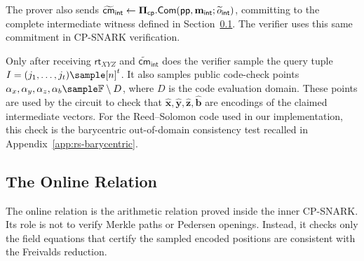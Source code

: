 \documentclass[conference,compsoc]{IEEEtran}
\newcommand{\para}{\textsf{pp}}
\newcommand{\cm}{\textsf{cm}}
\newcommand{\rt}{\textsf{rt}}
\newcommand{\vect}{\mathbf}         %
\newcommand{\bPi}{{\bf \Pi}}
\newcommand{\com}{{\sf Com}}
\newcommand{\cp}{{\mathsf{cp}}}
\theoremstyle{plain}
\theoremstyle{definition}
\theoremstyle{remark}
\begin{document}
The prover also sends
\ensuremath{\widetilde{\cm}_{\mathsf{int}}\gets
\bPi_{\cp}.\com(\para,\vect m_{\mathsf{int}};\widetilde o_{\mathsf{int}})},
committing to the complete intermediate witness defined in
Section~\ref{sec:snark-relation}. The verifier uses this same commitment in
CP-SNARK verification.

Only after receiving \(\rt_{XYZ}\) and \ensuremath{\widetilde{\cm}_{\mathsf{int}}} does the verifier sample the query tuple
{\footnotesize \(I=(j_1,\ldots,j_t)\sample [n]^t\).}
It also samples public code-check points
{\footnotesize
\(\alpha_x,\alpha_y,\alpha_z, \ensuremath{\alpha_b}\sample\mathbb{F}\setminus D\),
}
where \(D\) is the
code evaluation domain. These points are used by the circuit to check that
{\footnotesize
\(\widehat{\vect{x}},\widehat{\vect{y}},\widehat{\vect{z}}, \ensuremath{\widehat{\vect{b}}}\)
}
are encodings of
the claimed intermediate vectors. For the Reed--Solomon code used in our
implementation, this check is the barycentric out-of-domain consistency test
recalled in Appendix~\ref{app:rs-barycentric}.

\subsection{The Online Relation}
\label{sec:snark-relation}
The online relation is the arithmetic relation proved inside the
inner CP-SNARK.  Its role is not to verify Merkle paths or Pedersen openings.
Instead, it checks only the field equations that certify the sampled encoded
positions are consistent with the Freivalds reduction.
\end{document}
